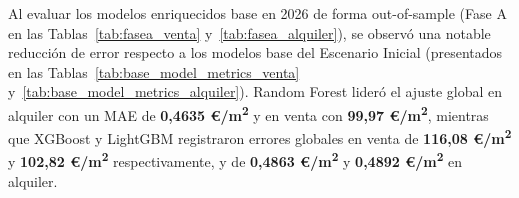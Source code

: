 \documentclass[a4paper,11pt,openany]{book}
\begin{document}
\begin{table}[H]
\centering
\caption{Matriz de rendimiento comparativa: Fase A - Línea Base Enriquecida - Mercado de Alquiler (€/m\textsuperscript{2})}
\label{tab:fasea_alquiler}
\end{table}


Al evaluar los modelos enriquecidos base en 2026 de forma out-of-sample (Fase A en las Tablas~\ref{tab:fasea_venta} y~\ref{tab:fasea_alquiler}), se observó una notable reducción de error respecto a los modelos base del Escenario Inicial (presentados en las Tablas~\ref{tab:base_model_metrics_venta} y~\ref{tab:base_model_metrics_alquiler}). Random Forest lideró el ajuste global en alquiler con un MAE de \textbf{0,4635 €/m\textsuperscript{2}} y en venta con \textbf{99,97 €/m\textsuperscript{2}}, mientras que XGBoost y LightGBM registraron errores globales en venta de \textbf{116,08 €/m\textsuperscript{2}} y \textbf{102,82 €/m\textsuperscript{2}} respectivamente, y de \textbf{0,4863 €/m\textsuperscript{2}} y \textbf{0,4892 €/m\textsuperscript{2}} en alquiler.
\end{document}
